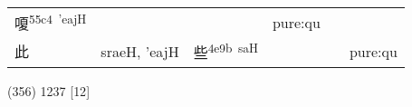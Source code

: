 \documentclass[14pt,a4paper]{scrartcl}
\begin{document}
\begin{longtable}[c]{@{}llllll@{}}
\begin{minipage}[t]{0.14\columnwidth}
嗄\textsuperscript{55c4~'eajH}
\strut\end{minipage} &
\begin{minipage}[t]{0.14\columnwidth}\raggedright\strut
\strut\end{minipage} &
\begin{minipage}[t]{0.14\columnwidth}\raggedright\strut
\strut\end{minipage} &
\begin{minipage}[t]{0.14\columnwidth}\raggedright\strut
pure:qu
\strut\end{minipage}\tabularnewline
\begin{minipage}[t]{0.14\columnwidth}\raggedright\strut
此
\strut\end{minipage} &
\begin{minipage}[t]{0.14\columnwidth}\raggedright\strut
sraeH, 'eajH
\strut\end{minipage} &
\begin{minipage}[t]{0.14\columnwidth}\raggedright\strut
些\textsuperscript{4e9b~saH}
\strut\end{minipage} &
\begin{minipage}[t]{0.14\columnwidth}\raggedright\strut
\strut\end{minipage} &
\begin{minipage}[t]{0.14\columnwidth}\raggedright\strut
\strut\end{minipage} &
\begin{minipage}[t]{0.14\columnwidth}\raggedright\strut
pure:qu
\strut\end{minipage}\tabularnewline
\bottomrule
\end{longtable}

(356) 1237 {[}12{]}
\end{document}
